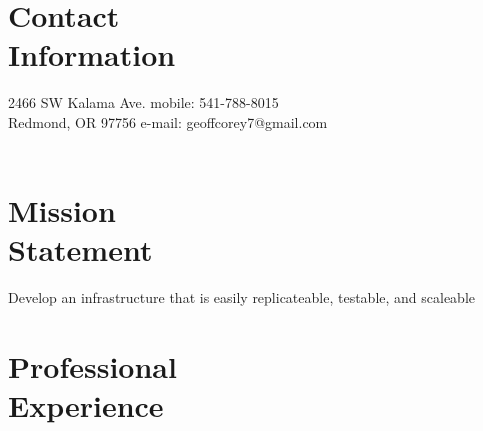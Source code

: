 \documentclass[margin,line]{resume}
\begin{document}
\begin{resume}

    \section{\mysidestyle Contact\\Information}

    2466 SW Kalama Ave.   \hfill mobile: 541-788-8015         \vspace{0mm}\\\vspace{0mm}%
    Redmond, OR 97756         \hfill e-mail: geoffcorey7@gmail.com  \vspace{0mm}\\\vspace{-4.5mm}\\

    \section{\mysidestyle Mission\\Statement}

    Develop an infrastructure that is easily replicateable, testable, and scaleable\\

    \section{\mysidestyle Professional\\Experience}


\end{resume}
\end{document}
